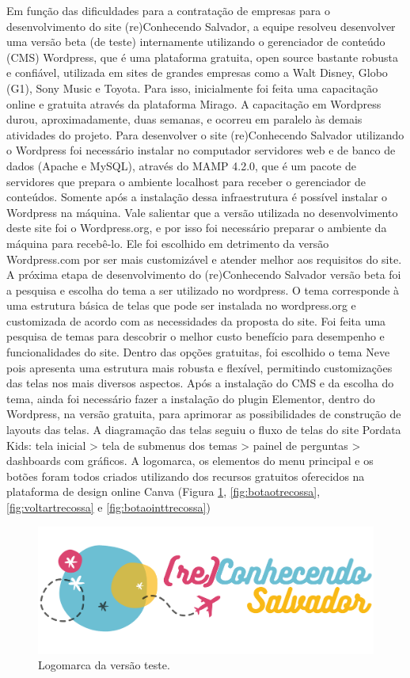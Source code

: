 \documentclass[
]{book}
\begin{document}
Em função das dificuldades para a contratação de empresas para o
desenvolvimento do site (re)Conhecendo Salvador, a equipe resolveu
desenvolver uma versão beta (de teste) internamente utilizando o
gerenciador de conteúdo (CMS) Wordpress, que é uma plataforma
gratuita, open source bastante robusta e confiável, utilizada em sites de grandes empresas como a Walt Disney, Globo (G1), Sony Music e Toyota. Para isso, inicialmente foi feita uma capacitação online e gratuita através da plataforma Mirago.
A capacitação em Wordpress durou, aproximadamente, duas semanas, e ocorreu em paralelo às demais atividades do projeto. Para desenvolver o site (re)Conhecendo Salvador utilizando o Wordpress foi necessário instalar no computador servidores web e de banco de dados (Apache e MySQL), através do MAMP 4.2.0, que é um pacote de servidores que prepara o ambiente localhost para receber o gerenciador de conteúdos. Somente após a instalação dessa infraestrutura é possível instalar o Wordpress na máquina. Vale salientar que a versão utilizada no desenvolvimento deste site foi o Wordpress.org, e por isso foi necessário preparar o ambiente da máquina para recebê-lo. Ele foi escolhido em detrimento da versão Wordpress.com por ser mais customizável e atender melhor aos requisitos do site.
A próxima etapa de desenvolvimento do (re)Conhecendo Salvador versão beta foi a pesquisa e escolha do tema a ser utilizado no wordpress. O tema corresponde à uma estrutura básica de telas que pode ser instalada no wordpress.org e customizada de acordo com as necessidades da proposta do site. Foi feita uma pesquisa de temas para descobrir o melhor custo benefício para desempenho e funcionalidades do site. Dentro das opções gratuitas, foi escolhido o tema Neve pois apresenta uma estrutura mais robusta e flexível, permitindo customizações das telas nos mais diversos aspectos. Após a instalação do CMS e da escolha do tema, ainda foi necessário fazer a instalação do plugin Elementor, dentro do Wordpress, na versão gratuita, para aprimorar as possibilidades de construção de layouts das telas.
A diagramação das telas seguiu o fluxo de telas do site Pordata Kids: tela inicial \textgreater{} tela de submenus dos temas \textgreater{} painel de perguntas \textgreater{} dashboards com gráficos. A logomarca, os elementos do menu principal e os botões foram todos criados utilizando dos recursos gratuitos oferecidos na plataforma de design online Canva (Figura \ref{fig:logotrecossa}, \ref{fig:botaotrecossa}, \ref{fig:voltartrecossa} e \ref{fig:botaointtrecossa})

\begin{figure}
\includegraphics[width=0.5\linewidth]{images/image11} \caption{Logomarca da versão teste.}\label{fig:logotrecossa}
\end{figure}
\end{document}
